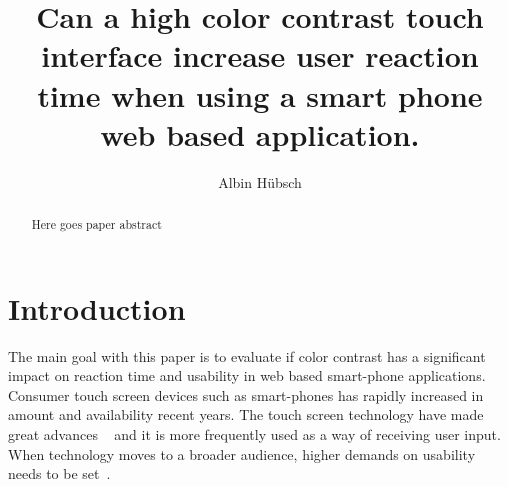 \documentclass[runningheads,a4paper,oribibl]{llncs}
\begin{document}
\pagestyle{headings}

\mainmatter


\title{Can a high color contrast touch interface increase user reaction time when using a smart phone web based application.}





\author{Albin Hübsch}


\maketitle

%
\begin{abstract}
Here goes paper abstract
\end{abstract}
%

\section{Introduction}
The main goal with this paper is to evaluate if color contrast has a significant impact on reaction time and usability in web based smart-phone applications. Consumer touch screen devices such as smart-phones has rapidly increased in amount and availability recent years. The touch screen technology have made great advances ~\cite{jennings2013touch} and it is more frequently used as a way of receiving user input. When technology moves to a broader audience, higher demands on usability needs to be set~\cite{gong2004guidelines}. 
\end{document}
